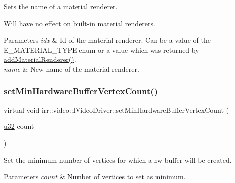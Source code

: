 Sets the name of a material renderer. 

Will have no effect on built-\/in material renderers. 
\begin{DoxyParams}{Parameters}
{\em idx} & Id of the material renderer. Can be a value of the E\+\_\+\+M\+A\+T\+E\+R\+I\+A\+L\+\_\+\+T\+Y\+PE enum or a value which was returned by \hyperlink{classirr_1_1video_1_1IVideoDriver_a0dfc3a7168f3a73a6f4323b579f03ff6}{add\+Material\+Renderer()}. \\
\hline
{\em name} & New name of the material renderer. \\
\hline
\end{DoxyParams}
\mbox{\label{classirr_1_1video_1_1IVideoDriver_a79cbd1329b4206503e9a9593592502ea}} 
\subsubsection{\texorpdfstring{set\+Min\+Hardware\+Buffer\+Vertex\+Count()}{setMinHardwareBufferVertexCount()}\hspace{0.1cm}{\footnotesize\ttfamily [1/2]}}
{\footnotesize\ttfamily virtual void irr\+::video\+::\+I\+Video\+Driver\+::set\+Min\+Hardware\+Buffer\+Vertex\+Count (\begin{DoxyParamCaption}\item[{\hyperlink{namespaceirr_a0416a53257075833e7002efd0a18e804}{u32}}]{count }\end{DoxyParamCaption})\hspace{0.3cm}{\ttfamily [pure virtual]}}



Set the minimum number of vertices for which a hw buffer will be created. 


\begin{DoxyParams}{Parameters}
{\em count} & Number of vertices to set as minimum. \\
\hline
\end{DoxyParams}
\mbox{\label{classirr_1_1video_1_1IVideoDriver_a79cbd1329b4206503e9a9593592502ea}} 
